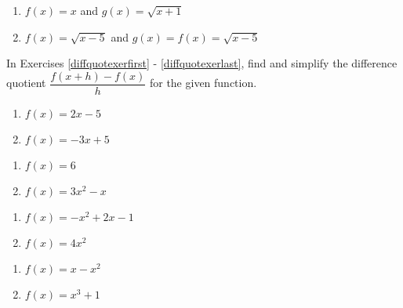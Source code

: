 \begin{multicols}{2}
\begin{enumerate}
\setcounter{enumi}{\value{HW}}

\item $f(x) = x$ and $g(x) = \sqrt{x+1}$
\item $f(x) =\sqrt{x-5}$ and $g(x) = f(x) = \sqrt{x-5}$ \label{basicarithtwolast}

\setcounter{HW}{\value{enumi}}
\end{enumerate}
\end{multicols}

In Exercises \ref{diffquotexerfirst} - \ref{diffquotexerlast}, find and simplify the difference quotient $\dfrac{f(x+h) - f(x)}{h}$ for the given function.

\begin{multicols}{2}

\begin{enumerate}
\setcounter{enumi}{\value{HW}}

\item $f(x) = 2x - 5$ \label{diffquotexerfirst}
\item $f(x) = -3x + 5$

\setcounter{HW}{\value{enumi}}
\end{enumerate}
\end{multicols}

\begin{multicols}{2}
\begin{enumerate}
\setcounter{enumi}{\value{HW}}

\item $f(x) = 6$
\item $f(x) = 3x^2 - x$

\setcounter{HW}{\value{enumi}}
\end{enumerate}
\end{multicols}

\begin{multicols}{2}
\begin{enumerate}
\setcounter{enumi}{\value{HW}}

\item $f(x) = -x^2 + 2x - 1$
\item  $f(x) = 4x^2$ 

\setcounter{HW}{\value{enumi}}
\end{enumerate}
\end{multicols}

\begin{multicols}{2}
\begin{enumerate}
\setcounter{enumi}{\value{HW}}

\item  $f(x) = x-x^2$ 
\item $f(x) = x^{3} + 1$

\setcounter{HW}{\value{enumi}}
\end{enumerate}
\end{multicols}

